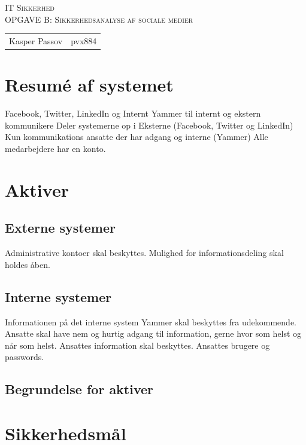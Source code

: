 \documentclass{article}
\begin{document}
\begin{titlepage}
\begin{center}
\textsc{\Large IT Sikkerhed}\\[0.5cm]
\textsc{OPGAVE B: Sikkerhedsanalyse af sociale medier}\\[0.5cm]
\vspace{2 cm}
\begin{tabular}{ll}
Kasper Passov & pvx884\\
\end{tabular}
\end{center}
\vspace{5 cm}
\newpage
\tableofcontents
\end{titlepage}

\section{Resumé af systemet}
Facebook, Twitter, LinkedIn og Internt Yammer til internt og ekstern kommunikere
Deler systemerne op i Eksterne (Facebook, Twitter og LinkedIn) Kun kommunikations ansatte der har adgang 
og interne (Yammer) Alle medarbejdere har en konto.


\section{Aktiver}
\subsection{Externe systemer}
Administrative kontoer skal beskyttes. Mulighed for informationsdeling skal holdes åben.

\subsection{Interne systemer}
Informationen på det interne system Yammer skal beskyttes fra udekommende. Ansatte skal have nem og hurtig adgang til information, gerne hvor som helst og når som helst. Ansattes information skal beskyttes. Ansattes brugere og passwords. 

\subsection{Begrundelse for aktiver}

\section{Sikkerhedsmål}
\end{document}

